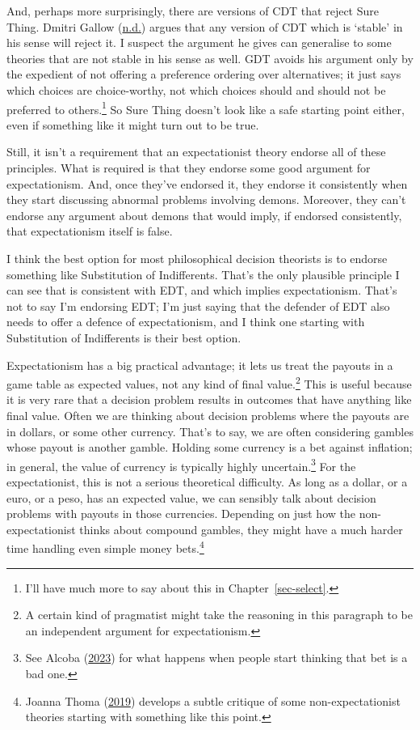 \documentclass[
  12pt,
  letterpaper,
  DIV=11,
  numbers=noendperiod]{scrreprt}
\begin{document}
And, perhaps more surprisingly, there are versions of CDT that reject
Sure Thing. Dmitri Gallow (\protect\hyperlink{ref-Gallownd}{n.d.})
argues that any version of CDT which is `stable' in his sense will
reject it. I suspect the argument he gives can generalise to some
theories that are not stable in his sense as well. GDT avoids his
argument only by the expedient of not offering a preference ordering
over alternatives; it just says which choices are choice-worthy, not
which choices should and should not be preferred to others.\footnote{I'll
  have much more to say about this in Chapter~\ref{sec-select}.} So Sure
Thing doesn't look like a safe starting point either, even if something
like it might turn out to be true.

Still, it isn't a requirement that an expectationist theory endorse all
of these principles. What is required is that they endorse some good
argument for expectationism. And, once they've endorsed it, they endorse
it consistently when they start discussing abnormal problems involving
demons. Moreover, they can't endorse any argument about demons that
would imply, if endorsed consistently, that expectationism itself is
false.

I think the best option for most philosophical decision theorists is to
endorse something like Substitution of Indifferents. That's the only
plausible principle I can see that is consistent with EDT, and which
implies expectationism. That's not to say I'm endorsing EDT; I'm just
saying that the defender of EDT also needs to offer a defence of
expectationism, and I think one starting with Substitution of
Indifferents is their best option.

Expectationism has a big practical advantage; it lets us treat the
payouts in a game table as expected values, not any kind of final
value.\footnote{A certain kind of pragmatist might take the reasoning in
  this paragraph to be an independent argument for expectationism.} This
is useful because it is very rare that a decision problem results in
outcomes that have anything like final value. Often we are thinking
about decision problems where the payouts are in dollars, or some other
currency. That's to say, we are often considering gambles whose payout
is another gamble. Holding some currency is a bet against inflation; in
general, the value of currency is typically highly uncertain.\footnote{See
  Alcoba (\protect\hyperlink{ref-Alcoba2023}{2023}) for what happens
  when people start thinking that bet is a bad one.} For the
expectationist, this is not a serious theoretical difficulty. As long as
a dollar, or a euro, or a peso, has an expected value, we can sensibly
talk about decision problems with payouts in those currencies. Depending
on just how the non-expectationist thinks about compound gambles, they
might have a much harder time handling even simple money
bets.\footnote{Joanna Thoma (\protect\hyperlink{ref-Thoma2019}{2019})
  develops a subtle critique of some non-expectationist theories
  starting with something like this point.}
\end{document}
